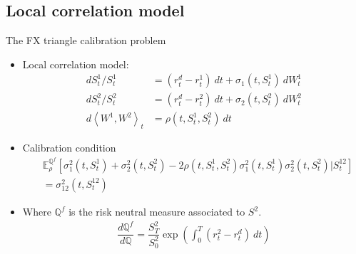 \documentclass[10pt]{beamer} %
\begin{document}
    \subsection{Local correlation model}
    \begin{frame}[t]{The FX triangle calibration problem}
    		\begin{itemize}
			\item<+-> Local correlation model:
            \begin{align*}
            d S_t^1/S_t^1 &= (r_t^d - r_t^1) \:dt + \sigma_1(t,S_t^1)\:dW_t^1 \\
            d S_t^2/S_t^2 &= (r_t^d - r_t^2) \:dt + \sigma_2(t,S_t^2)\:dW_t^2 \\
            d \left\langle W^1,W^2 \right\rangle_t &= \rho(t,S_t^1,S_t^2)\:dt
            \end{align*}
			\item<+-> Calibration condition
            \begin{align*}
            & \mathbb{E}^{\mathbb{Q}^f}_{\rho} \left[ \sigma_1^2(t, S_t^1) + \sigma_2^2(t, S_t^2) - 2\rho(t, S_t^1, S_t^2)\sigma_1^2(t, S_t^1)\sigma_2^2(t, S_t^2)|S_t^{12} \right] \\
            & = \sigma_{12}^2(t, S_t^{12})
            \end{align*}
            \item<+-> Where $\mathbb{Q}^f$ is the risk neutral measure associated to $S^2$.
            \begin{align*}
            \dfrac{d\mathbb{Q}^{f}}{d\mathbb{Q}} = \dfrac{S_T^{2}}{S_0^{2}} \exp \left(
            \int_0^{T} (r_t^{2} - r_t^{d}) \: dt \right)
            \end{align*}
		\end{itemize}
    \end{frame}
    
\end{document}
